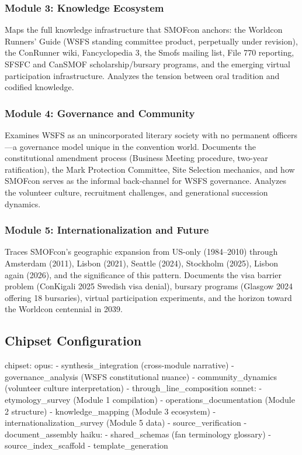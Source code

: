 \documentclass[11pt,letterpaper]{article}
\begin{document}
\subsubsection{Module 3: Knowledge Ecosystem}

Maps the full knowledge infrastructure that SMOFcon anchors: the Worldcon Runners' Guide (WSFS standing committee product, perpetually under revision), the ConRunner wiki, Fancyclopedia 3, the Smofs mailing list, File 770 reporting, SFSFC and CanSMOF scholarship/bursary programs, and the emerging virtual participation infrastructure. Analyzes the tension between oral tradition and codified knowledge.

\subsubsection{Module 4: Governance and Community}

Examines WSFS as an unincorporated literary society with no permanent officers---a governance model unique in the convention world. Documents the constitutional amendment process (Business Meeting procedure, two-year ratification), the Mark Protection Committee, Site Selection mechanics, and how SMOFcon serves as the informal back-channel for WSFS governance. Analyzes the volunteer culture, recruitment challenges, and generational succession dynamics.

\subsubsection{Module 5: Internationalization and Future}

Traces SMOFcon's geographic expansion from US-only (1984--2010) through Amsterdam (2011), Lisbon (2021), Seattle (2024), Stockholm (2025), Lisbon again (2026), and the significance of this pattern. Documents the visa barrier problem (ConKigali 2025 Swedish visa denial), bursary programs (Glasgow 2024 offering 18 bursaries), virtual participation experiments, and the horizon toward the Worldcon centennial in 2039.

\subsection{Chipset Configuration}

\begin{asciibox}
chipset:
  opus:
    - synthesis_integration (cross-module narrative)
    - governance_analysis (WSFS constitutional nuance)
    - community_dynamics (volunteer culture interpretation)
    - through_line_composition
  sonnet:
    - etymology_survey (Module 1 compilation)
    - operations_documentation (Module 2 structure)
    - knowledge_mapping (Module 3 ecosystem)
    - internationalization_survey (Module 5 data)
    - source_verification
    - document_assembly
  haiku:
    - shared_schemas (fan terminology glossary)
    - source_index_scaffold
    - template_generation
\end{asciibox}
\end{document}
